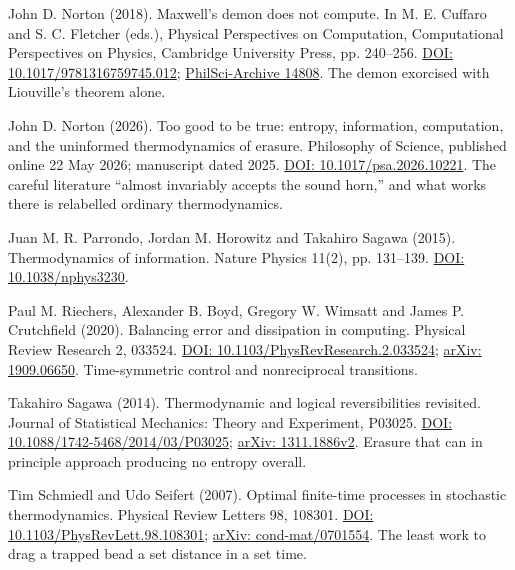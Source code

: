 \noindent John D. Norton (2018). Maxwell's demon does not compute. In M. E. Cuffaro and S. C. Fletcher (eds.), Physical Perspectives on Computation, Computational Perspectives on Physics, Cambridge University Press, pp. 240--256. \href{https://doi.org/10.1017/9781316759745.012}{DOI: 10.1017/9781316759745.012}; \href{https://philsci-archive.pitt.edu/14808/}{PhilSci-Archive 14808}. The demon exorcised with Liouville's theorem alone.
\par\medskip

\noindent John D. Norton (2026). Too good to be true: entropy, information, computation, and the uninformed thermodynamics of erasure. Philosophy of Science, published online 22 May 2026; manuscript dated 2025. \href{https://doi.org/10.1017/psa.2026.10221}{DOI: 10.1017/psa.2026.10221}. The careful literature ``almost invariably accepts the sound horn,'' and what works there is relabelled ordinary thermodynamics.
\par\medskip

\noindent Juan M. R. Parrondo, Jordan M. Horowitz and Takahiro Sagawa (2015). Thermodynamics of information. Nature Physics 11(2), pp. 131--139. \href{https://doi.org/10.1038/nphys3230}{DOI: 10.1038/nphys3230}.
\par\medskip

\noindent Paul M. Riechers, Alexander B. Boyd, Gregory W. Wimsatt and James P. Crutchfield (2020). Balancing error and dissipation in computing. Physical Review Research 2, 033524. \href{https://doi.org/10.1103/PhysRevResearch.2.033524}{DOI: 10.1103/PhysRevResearch.2.033524}; \href{https://arxiv.org/abs/1909.06650}{arXiv: 1909.06650}. Time-symmetric control and nonreciprocal transitions.
\par\medskip

\noindent Takahiro Sagawa (2014). Thermodynamic and logical reversibilities revisited. Journal of Statistical Mechanics: Theory and Experiment, P03025. \href{https://doi.org/10.1088/1742-5468/2014/03/P03025}{DOI: 10.1088/1742-5468/2014/03/P03025}; \href{https://arxiv.org/abs/1311.1886v2}{arXiv: 1311.1886v2}. Erasure that can in principle approach producing no entropy overall.
\par\medskip

\noindent Tim Schmiedl and Udo Seifert (2007). Optimal finite-time processes in stochastic thermodynamics. Physical Review Letters 98, 108301. \href{https://doi.org/10.1103/PhysRevLett.98.108301}{DOI: 10.1103/PhysRevLett.98.108301}; \href{https://arxiv.org/abs/cond-mat/0701554}{arXiv: cond-mat/0701554}. The least work to drag a trapped bead a set distance in a set time.
\par\medskip

